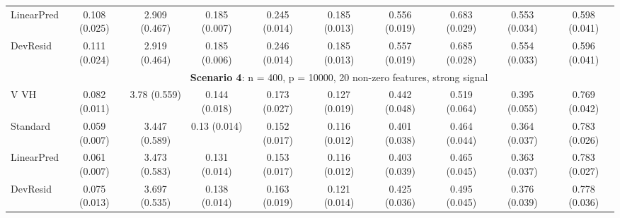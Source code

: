 \documentclass{article}
\begin{document}
\begin{landscape}
\begin{table}[h]
\begin{tabular}[t]{lccccccccc}
LinearPred  & 0.108 (0.025) & 2.909 (0.467) & 0.185 (0.007) & 0.245 (0.014) & 0.185 (0.013) & 0.556 (0.019) & 0.683 (0.029) & 0.553 (0.034) & 0.598 (0.041) \\  
DevResid  & 0.111 (0.024) & 2.919 (0.464) & 0.185 (0.006) & 0.246 (0.014) & 0.185 (0.013) & 0.557 (0.019) & 0.685 (0.028) & 0.554 (0.033) & 0.596 (0.041) \\
\addlinespace
&\multicolumn{9}{c}{\textbf{Scenario 4}: n = 400, p = 10000, 20 non-zero features, strong signal}\\
\cline{2-10}
V VH  & 0.082 (0.011) & 3.78 (0.559) & 0.144 (0.018) & 0.173 (0.027) & 0.127 (0.019) & 0.442 (0.048) & 0.519 (0.064) & 0.395 (0.055) & 0.769 (0.042) \\ 
Standard  & 0.059 (0.007) & 3.447 (0.589) & 0.13 (0.014) & 0.152 (0.017) & 0.116 (0.012) & 0.401 (0.038) & 0.464 (0.044) & 0.364 (0.037) & 0.783 (0.026) \\    
 LinearPred  & 0.061 (0.007) & 3.473 (0.583) & 0.131 (0.014) & 0.153 (0.017) & 0.116 (0.012) & 0.403 (0.039) & 0.465 (0.045) & 0.363 (0.037) & 0.783 (0.027) \\ 
 DevResid  & 0.075 (0.013) & 3.697 (0.535) & 0.138 (0.014) & 0.163 (0.019) & 0.121 (0.014) & 0.425 (0.036) & 0.495 (0.045) & 0.376 (0.039) & 0.778 (0.036) \\
\bottomrule
\end{tabular}
\end{table}


\end{landscape}
\end{document}

